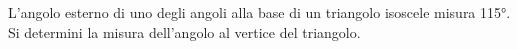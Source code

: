 L'angolo esterno di uno degli angoli alla base di 
un triangolo isoscele misura 115°. 
Si determini la misura dell'angolo al
vertice del triangolo.